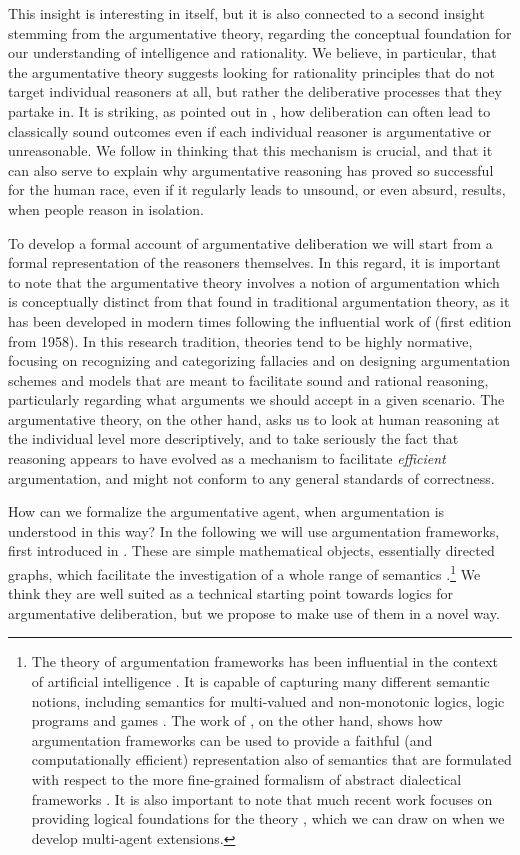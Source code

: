 \documentclass[greybox]{svmult}
\begin{document}
This insight is interesting in itself, but it is also connected to a second insight stemming from the argumentative theory, regarding the conceptual foundation for our understanding of intelligence and rationality. 
We believe, in particular, that the argumentative theory suggests looking for rationality principles that do not target individual reasoners at all, but rather the deliberative processes that they partake in. It is striking, as pointed out in \cite{mercier}, how deliberation can often lead to classically sound outcomes even if each individual reasoner is argumentative or unreasonable. We follow \cite{mercier} in thinking that this mechanism is crucial, and that it can also serve to explain why argumentative reasoning has proved so successful for the human race, even if it regularly leads to unsound, or even absurd, results, when people reason in isolation. 

To develop a formal account of argumentative deliberation we will start from a formal representation of the reasoners themselves. In this regard, it is important to note that the argumentative theory involves a notion of argumentation which is conceptually distinct from that found in traditional argumentation theory, as it has been developed in modern times following the influential work of \cite{toulmin} (first edition from 1958). In this research tradition, theories  tend to be highly normative, focusing on recognizing and categorizing fallacies and on designing argumentation schemes and models that are meant to facilitate sound and rational reasoning, particularly regarding what arguments we should accept in a given scenario. The argumentative theory, on the other hand, asks us to look at human reasoning at the individual level more descriptively, and to take seriously the fact that reasoning appears to have evolved as a mechanism to facilitate \emph{efficient} argumentation, and might not conform to any general standards of correctness.

How can we formalize the argumentative agent, when argumentation is understood in this way? In the following we will use argumentation frameworks, first introduced in \cite{dung}. These are simple mathematical objects, essentially directed graphs, which facilitate the investigation of a whole range of semantics \cite{baroni}.\footnote{The theory of argumentation frameworks has been influential in the context of artificial intelligence \cite{rahwan}. It is capable of capturing many different semantic notions, including semantics for multi-valued and non-monotonic logics, logic programs and games \cite{dung,dyrkolbotn}. The work of \cite{brewka}, on the other hand, shows how argumentation frameworks can be used to provide a faithful (and computationally efficient) representation also of semantics that are formulated with respect to the more fine-grained formalism of abstract dialectical frameworks \cite{brewka1}. It is also important to note that much recent work focuses on providing logical foundations for the theory \cite{grossi,grossi1,arieli,caminada}, which we can draw on when we develop multi-agent extensions.} We think they are well suited as a technical starting point towards logics for argumentative deliberation, but we propose to make use of them in a novel way.
\end{document}
